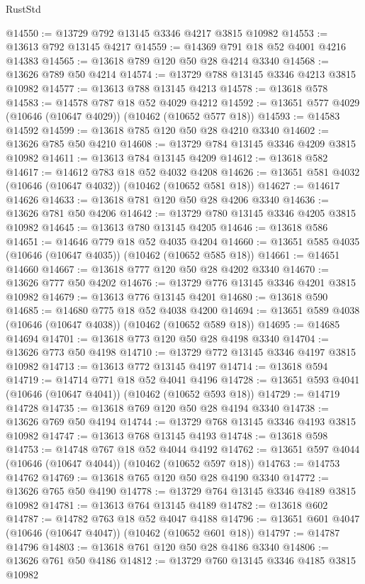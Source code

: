 \begin{lexlean}{RustStd}
\begin{coremodule}
@14550 := @13729 @792 @13145 @3346 @4217 @3815 @10982
@14553 := @13613 @792 @13145 @4217
@14559 := @14369 @791 @18 @52 @4001 @4216 @14383
@14565 := @13618 @789 @120 @50 @28 @4214 @3340
@14568 := @13626 @789 @50 @4214
@14574 := @13729 @788 @13145 @3346 @4213 @3815 @10982
@14577 := @13613 @788 @13145 @4213
@14578 := @13618 @578
@14583 := @14578 @787 @18 @52 @4029 @4212
@14592 := @13651 @577 @4029 (@10646 (@10647 @4029)) (@10462 (@10652 @577 @18))
@14593 := @14583 @14592
@14599 := @13618 @785 @120 @50 @28 @4210 @3340
@14602 := @13626 @785 @50 @4210
@14608 := @13729 @784 @13145 @3346 @4209 @3815 @10982
@14611 := @13613 @784 @13145 @4209
@14612 := @13618 @582
@14617 := @14612 @783 @18 @52 @4032 @4208
@14626 := @13651 @581 @4032 (@10646 (@10647 @4032)) (@10462 (@10652 @581 @18))
@14627 := @14617 @14626
@14633 := @13618 @781 @120 @50 @28 @4206 @3340
@14636 := @13626 @781 @50 @4206
@14642 := @13729 @780 @13145 @3346 @4205 @3815 @10982
@14645 := @13613 @780 @13145 @4205
@14646 := @13618 @586
@14651 := @14646 @779 @18 @52 @4035 @4204
@14660 := @13651 @585 @4035 (@10646 (@10647 @4035)) (@10462 (@10652 @585 @18))
@14661 := @14651 @14660
@14667 := @13618 @777 @120 @50 @28 @4202 @3340
@14670 := @13626 @777 @50 @4202
@14676 := @13729 @776 @13145 @3346 @4201 @3815 @10982
@14679 := @13613 @776 @13145 @4201
@14680 := @13618 @590
@14685 := @14680 @775 @18 @52 @4038 @4200
@14694 := @13651 @589 @4038 (@10646 (@10647 @4038)) (@10462 (@10652 @589 @18))
@14695 := @14685 @14694
@14701 := @13618 @773 @120 @50 @28 @4198 @3340
@14704 := @13626 @773 @50 @4198
@14710 := @13729 @772 @13145 @3346 @4197 @3815 @10982
@14713 := @13613 @772 @13145 @4197
@14714 := @13618 @594
@14719 := @14714 @771 @18 @52 @4041 @4196
@14728 := @13651 @593 @4041 (@10646 (@10647 @4041)) (@10462 (@10652 @593 @18))
@14729 := @14719 @14728
@14735 := @13618 @769 @120 @50 @28 @4194 @3340
@14738 := @13626 @769 @50 @4194
@14744 := @13729 @768 @13145 @3346 @4193 @3815 @10982
@14747 := @13613 @768 @13145 @4193
@14748 := @13618 @598
@14753 := @14748 @767 @18 @52 @4044 @4192
@14762 := @13651 @597 @4044 (@10646 (@10647 @4044)) (@10462 (@10652 @597 @18))
@14763 := @14753 @14762
@14769 := @13618 @765 @120 @50 @28 @4190 @3340
@14772 := @13626 @765 @50 @4190
@14778 := @13729 @764 @13145 @3346 @4189 @3815 @10982
@14781 := @13613 @764 @13145 @4189
@14782 := @13618 @602
@14787 := @14782 @763 @18 @52 @4047 @4188
@14796 := @13651 @601 @4047 (@10646 (@10647 @4047)) (@10462 (@10652 @601 @18))
@14797 := @14787 @14796
@14803 := @13618 @761 @120 @50 @28 @4186 @3340
@14806 := @13626 @761 @50 @4186
@14812 := @13729 @760 @13145 @3346 @4185 @3815 @10982

\end{coremodule}
\end{lexlean}
